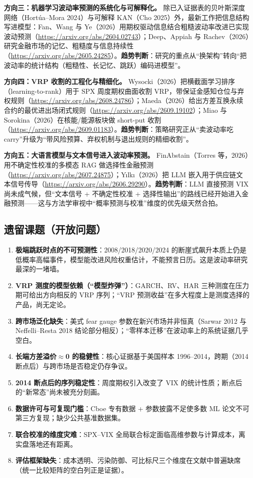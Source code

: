 \documentclass[11pt,a4paper]{article}
\begin{document}
\textbf{方向三：机器学习波动率预测的系统化与可解释化。} 除已入证据表的贝叶斯深度网络（Hortúa--Mora 2024）与可解释 KAN（Cho 2025）外，最新工作把信息结构写进模型：Fan、Wang 与 Ye（2026）用期权驱动信息结合粗糙波动率改进已实现波动预测（\url{https://arxiv.org/abs/2604.02743}）；Deep、Appiah 与 Rachev（2026）研究金融市场的记忆、粗糙度与信息持续性（\url{https://arxiv.org/abs/2605.24285}）。\textbf{趋势判断}：研究的重点从“换架构”转向“把波动率的统计结构（粗糙性、长记忆、跳跃）编码进模型”。

\textbf{方向四：VRP 收割的工程化与精细化。} Wysocki（2026）把横截面学习排序（learning-to-rank）用于 SPX 周度期权曲面收割 VRP，带保证金感知仓位与弃权规则（\url{https://arxiv.org/abs/2608.24786}）；Maeda（2026）给出方差互换永续合约的最优进出场闭式规则（\url{https://arxiv.org/abs/2609.19102}）；Miao 与 Sorokina（2026）在核能/能源板块做 short-put 收割（\url{https://arxiv.org/abs/2609.01183}）。\textbf{趋势判断}：策略研究正从“卖波动率吃 carry”升级为“带风险预算、弃权机制与退出规则的精细收割”。

\textbf{方向五：大语言模型与文本信号进入波动率预测。} FinAbstain（Torres 等，2026）用不确定性校准的多模态 RAG 做选择性金融预测（\url{https://arxiv.org/abs/2607.24875}）；Yılkı（2026）把 LLM 嵌入用于供应链文本信号传导（\url{https://arxiv.org/abs/2606.29290}）。\textbf{趋势判断}：LLM 直接预测 VIX 尚未成气候，但“文本信号 + 不确定性校准 + 选择性输出”的路线已经开始进入金融预测——这与方法学审视中“概率预测与校准”维度的优先级天然合拍。

\subsection{遗留课题（开放问题）}

\begin{enumerate}[leftmargin=2.2em]
  \item \textbf{极端跳跃时点的不可预测性}：2008/2018/2020/2024 的断崖式飙升本质上仍是低概率高幅事件，模型能改进风险权重估计，不能预言日历。这是波动率研究最深的一堵墙。
  \item \textbf{VRP 测度的模型依赖（“模型炸弹”）}：GARCH、RV、HAR 三种测度在压力期可给出方向相反的 VRP 序列；“VRP 预测收益”在多大程度上是测度选择的产品，尚无定论。
  \item \textbf{跨市场泛化缺失}：美式 fear gauge 参数在新兴市场并非恒真（Sarwar 2012 与 Neffelli--Resta 2018 结论部分相反）；“零样本迁移”在波动率上的系统证据几乎空白。
  \item \textbf{长端方差溢价$\approx$0 的稳健性}：核心证据基于美国样本 1996--2014，跨期（2014 断点后）与跨市场是否稳定仍存争议。
  \item \textbf{2014 断点后的序列稳定性}：周度期权引入改变了 VIX 的统计性质；断点后的“新常态”尚未被充分刻画。
  \item \textbf{数据许可与可复现门槛}：Cboe 专有数据 + 参数披露不足使多数 ML 论文不可第三方复现；缺少公共基准数据集。
  \item \textbf{联合校准的维度灾难}：SPX--VIX 全局联合标定面临高维参数与计算成本，离实盘落地还有距离。
  \item \textbf{评估框架缺失}：成本透明、污染防御、可比标尺三个维度在文献中普遍缺席（统一比较矩阵的空白列正是证据）。
\end{enumerate}
\end{document}
